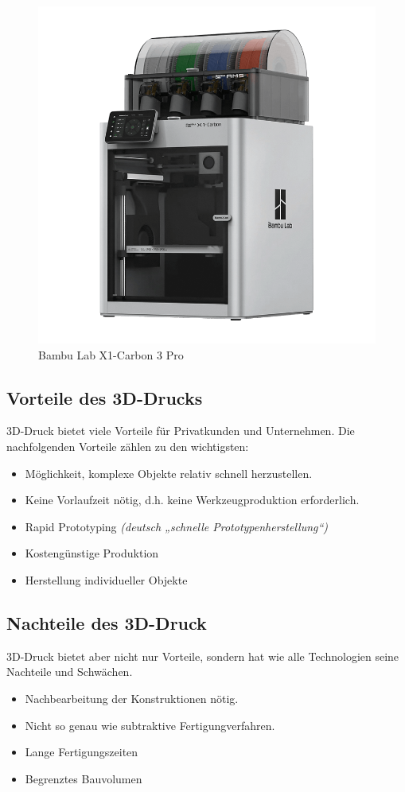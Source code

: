 \begin{figure}[H]
	\centering
	\includegraphics[width=0.8\linewidth]{images/3D-Drucker.png}
	\caption[Bambu Lab X1-Carbon 3 Pro]{Bambu Lab X1-Carbon 3 Pro}
	\label{fig:3D-Druck}
\end{figure}


\subsection{Vorteile des 3D-Drucks}
3D-Druck bietet viele Vorteile für Privatkunden und Unternehmen. Die nachfolgenden Vorteile zählen zu den wichtigsten:
\begin{itemize}
	\item Möglichkeit, komplexe Objekte relativ schnell herzustellen.
	\item Keine Vorlaufzeit nötig, d.h. keine Werkzeugproduktion erforderlich.
	\item Rapid Prototyping \emph{(deutsch „schnelle Prototypenherstellung“)}
	\item Kostengünstige Produktion
	\item Herstellung individueller Objekte
\end{itemize} \cite{3D-Druck-Vorteile}

\subsection{Nachteile des 3D-Druck}
3D-Druck bietet aber nicht nur Vorteile, sondern hat wie alle Technologien seine Nachteile und Schwächen.
\begin{itemize}
	\item Nachbearbeitung der Konstruktionen nötig.
	\item Nicht so genau wie subtraktive Fertigungverfahren.
	\item Lange Fertigungszeiten
	\item Begrenztes Bauvolumen
\end{itemize}
\cite{3D-Druck-Nachteile}

